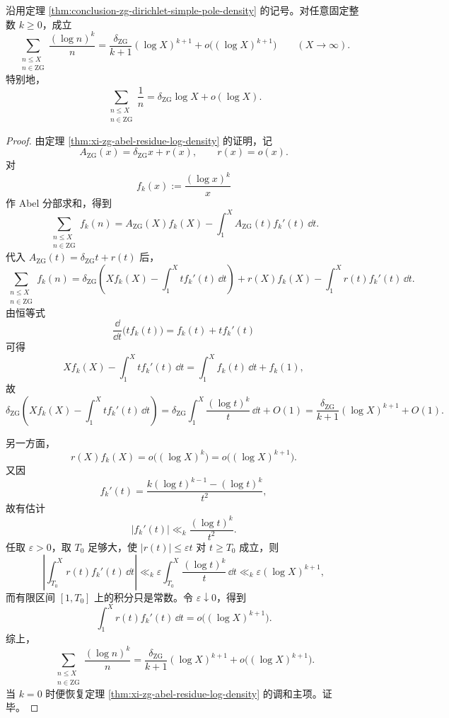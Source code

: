 \begin{corollary}\label{cor:conclusion-zg-weighted-mertens-cesaro}
沿用定理 \ref{thm:conclusion-zg-dirichlet-simple-pole-density} 的记号。对任意固定整数 \(k\ge 0\)，成立
\[
\boxed{\;
\sum_{\substack{n\le X\\ n\in \mathrm{ZG}}}\frac{(\log n)^k}{n}
=
\frac{\delta_{\mathrm{ZG}}}{k+1}(\log X)^{k+1}
+o\!\bigl((\log X)^{k+1}\bigr)
\qquad(X\to\infty).\;}
\]
特别地，
\[
\boxed{\;
\sum_{\substack{n\le X\\ n\in \mathrm{ZG}}}\frac1n
=
\delta_{\mathrm{ZG}}\log X+o(\log X).\;}
\]
\end{corollary}
\begin{proof}
由定理 \ref{thm:xi-zg-abel-residue-log-density} 的证明，记
\[
A_{\mathrm{ZG}}(x)=\delta_{\mathrm{ZG}}x+r(x),
\qquad
r(x)=o(x).
\]
对
\[
f_k(x):=\frac{(\log x)^k}{x}
\]
作 Abel 分部求和，得到
\[
\sum_{\substack{n\le X\\ n\in \mathrm{ZG}}}f_k(n)
=
A_{\mathrm{ZG}}(X)f_k(X)-\int_1^X A_{\mathrm{ZG}}(t)f_k'(t)\,\dd t.
\]
代入 \(A_{\mathrm{ZG}}(t)=\delta_{\mathrm{ZG}}t+r(t)\) 后，
\[
\sum_{\substack{n\le X\\ n\in \mathrm{ZG}}}f_k(n)
=
\delta_{\mathrm{ZG}}
\left(
Xf_k(X)-\int_1^X tf_k'(t)\,\dd t
\right)
+
r(X)f_k(X)-\int_1^X r(t)f_k'(t)\,\dd t.
\]
由恒等式
\[
\frac{\dd}{\dd t}\bigl(tf_k(t)\bigr)=f_k(t)+tf_k'(t)
\]
可得
\[
Xf_k(X)-\int_1^X tf_k'(t)\,\dd t
=
\int_1^X f_k(t)\,\dd t+f_k(1),
\]
故
\[
\delta_{\mathrm{ZG}}
\left(
Xf_k(X)-\int_1^X tf_k'(t)\,\dd t
\right)
=
\delta_{\mathrm{ZG}}\int_1^X \frac{(\log t)^k}{t}\,\dd t+O(1)
=
\frac{\delta_{\mathrm{ZG}}}{k+1}(\log X)^{k+1}+O(1).
\]

另一方面，
\[
r(X)f_k(X)=o\!\bigl((\log X)^k\bigr)
=
o\!\bigl((\log X)^{k+1}\bigr).
\]
又因
\[
f_k'(t)=\frac{k(\log t)^{k-1}-(\log t)^k}{t^2},
\]
故有估计
\[
|f_k'(t)|\ll_k \frac{(\log t)^k}{t^2}.
\]
任取 \(\varepsilon>0\)，取 \(T_0\) 足够大，使 \(|r(t)|\le \varepsilon t\) 对 \(t\ge T_0\) 成立，则
\[
\left|\int_{T_0}^X r(t)f_k'(t)\,\dd t\right|
\ll_k
\varepsilon\int_{T_0}^X \frac{(\log t)^k}{t}\,\dd t
\ll_k
\varepsilon(\log X)^{k+1},
\]
而有限区间 \([1,T_0]\) 上的积分只是常数。令 \(\varepsilon\downarrow 0\)，得到
\[
\int_1^X r(t)f_k'(t)\,\dd t
=
o\!\bigl((\log X)^{k+1}\bigr).
\]
综上，
\[
\sum_{\substack{n\le X\\ n\in \mathrm{ZG}}}\frac{(\log n)^k}{n}
=
\frac{\delta_{\mathrm{ZG}}}{k+1}(\log X)^{k+1}
+o\!\bigl((\log X)^{k+1}\bigr).
\]
当 \(k=0\) 时便恢复定理 \ref{thm:xi-zg-abel-residue-log-density} 的调和主项。证毕。
\end{proof}

